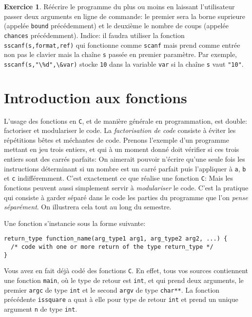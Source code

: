 \documentclass[french,a4paper]{article}
\theoremstyle{definition}
\newtheorem{exercise}{Exercice}
\theoremstyle{remark}
\newcommand{\inlinec}[1]{\lstinline[style=C]°#1°}
\begin{document}
\begin{exercise}
  Réécrire le programme du plus ou moins en laissant l'utilisateur
  passer deux arguments en ligne de commande: le premier sera la borne
  suprieure (appelée \inlinec{bound} précédemment) et le deuxième le
  nombre de coups (appelée \inlinec{chances} précédemment). Indice: il
  faudra utiliser la fonction \inlinec{sscanf(s,format,ref)} qui
  fonctionne comme \inlinec{scanf} mais prend comme entrée non pas le
  clavier mais la chaîne \inlinec{s} passée en premier paramètre. Par
  exemple, \inlinec{sscanf(s,"\%d",\&var)} stocke \inlinec{10} dans la
  variable \inlinec{var} si la chaîne \inlinec{s} vaut \inlinec{"10"}.
\end{exercise}

\section{Introduction aux fonctions}
\label{sec:function}

L'usage des fonctions en {\tt C}, et de manière générale en
programmation, est double: factoriser et modulariser le code. La {\em
  factorisation de code} consiste à éviter les répétitions bêtes et
méchantes de code. Prenons l'exemple d'un programme mettant en jeu
trois entiers, et qui à un moment donné doit vérifier si ces trois
entiers sont des carrés parfaits:  On
aimerait pouvoir n'écrire qu'une seule fois les instructions
déterminant si un nombre est un carré parfait puis l'appliquer à
\inlinec{a}, \inlinec{b} et \inlinec{c} indifféremment. C'est
exactement ce que réalise une fonction {\tt C}:
 Mais les fonctions peuvent aussi
simplement servir à {\em modulariser} le code. C'est la pratique qui
consiste à garder séparé dans le code les parties du programme que
l'on {\em pense séparément}. On illustrera cela tout au long du
semestre.

Une fonction s'instancie sous la forme suivante:
\begin{lstlisting}
return_type function_name(arg_type1 arg1, arg_type2 arg2, ...) {
  /* code with one or more return of the type return_type */
}  
\end{lstlisting}
Vous avez en fait déjà codé des fonctions {\tt C}. En effet, tous vos
sources contiennent une fonction \inlinec{main}, où le type de retour
est \inlinec{int}, et qui prend deux arguments, le premier
\inlinec{argc} de type \inlinec{int} et le second \inlinec{argv} de
type \inlinec{char**}. La fonction précédente \inlinec{issquare} a
quat à elle pour type de retour \inlinec{int} et prend un unique
argument \inlinec{n} de type \inlinec{int}.
\end{document}

